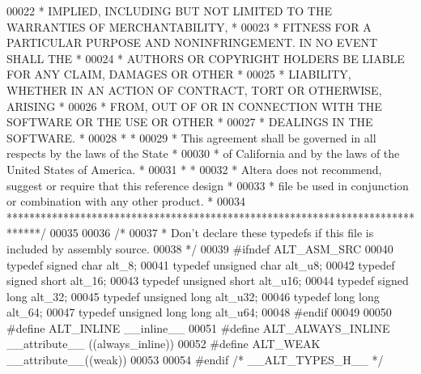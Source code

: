 \begin{DoxyCode}
00022 \textcolor{comment}{* IMPLIED, INCLUDING BUT NOT LIMITED TO THE WARRANTIES OF MERCHANTABILITY,    *}
00023 \textcolor{comment}{* FITNESS FOR A PARTICULAR PURPOSE AND NONINFRINGEMENT. IN NO EVENT SHALL THE *}
00024 \textcolor{comment}{* AUTHORS OR COPYRIGHT HOLDERS BE LIABLE FOR ANY CLAIM, DAMAGES OR OTHER      *}
00025 \textcolor{comment}{* LIABILITY, WHETHER IN AN ACTION OF CONTRACT, TORT OR OTHERWISE, ARISING     *}
00026 \textcolor{comment}{* FROM, OUT OF OR IN CONNECTION WITH THE SOFTWARE OR THE USE OR OTHER         *}
00027 \textcolor{comment}{* DEALINGS IN THE SOFTWARE.                                                   *}
00028 \textcolor{comment}{*                                                                             *}
00029 \textcolor{comment}{* This agreement shall be governed in all respects by the laws of the State   *}
00030 \textcolor{comment}{* of California and by the laws of the United States of America.              *}
00031 \textcolor{comment}{*                                                                             *}
00032 \textcolor{comment}{* Altera does not recommend, suggest or require that this reference design    *}
00033 \textcolor{comment}{* file be used in conjunction or combination with any other product.          *}
00034 \textcolor{comment}{******************************************************************************/}
00035 
00036 \textcolor{comment}{/* }
00037 \textcolor{comment}{ * Don't declare these typedefs if this file is included by assembly source.}
00038 \textcolor{comment}{ */}
00039 \textcolor{preprocessor}{#ifndef ALT\_ASM\_SRC}
00040 \textcolor{keyword}{typedef} \textcolor{keywordtype}{signed} \textcolor{keywordtype}{char}  alt_8;
00041 \textcolor{keyword}{typedef} \textcolor{keywordtype}{unsigned} \textcolor{keywordtype}{char}  alt_u8;
00042 \textcolor{keyword}{typedef} \textcolor{keywordtype}{signed} \textcolor{keywordtype}{short} alt_16;
00043 \textcolor{keyword}{typedef} \textcolor{keywordtype}{unsigned} \textcolor{keywordtype}{short} alt_u16;
00044 \textcolor{keyword}{typedef} \textcolor{keywordtype}{signed} \textcolor{keywordtype}{long} alt_32;
00045 \textcolor{keyword}{typedef} \textcolor{keywordtype}{unsigned} \textcolor{keywordtype}{long} alt_u32;
00046 \textcolor{keyword}{typedef} \textcolor{keywordtype}{long} \textcolor{keywordtype}{long} alt_64;
00047 \textcolor{keyword}{typedef} \textcolor{keywordtype}{unsigned} \textcolor{keywordtype}{long} \textcolor{keywordtype}{long} alt_u64;
00048 \textcolor{preprocessor}{#endif}
00049 
00050 \textcolor{preprocessor}{#define ALT\_INLINE        \_\_inline\_\_}
00051 \textcolor{preprocessor}{#define ALT\_ALWAYS\_INLINE \_\_attribute\_\_ ((always\_inline))}
00052 \textcolor{preprocessor}{#define ALT\_WEAK          \_\_attribute\_\_((weak))}
00053 
00054 \textcolor{preprocessor}{#endif }\textcolor{comment}{/* \_\_ALT\_TYPES\_H\_\_ */}\textcolor{preprocessor}{}
\end{DoxyCode}
